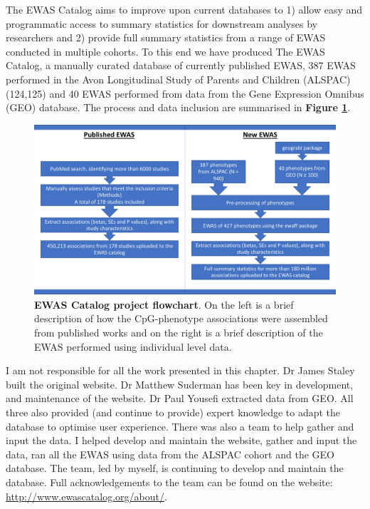 \documentclass[11pt,oneside]{bristolthesis}
\begin{document}
The EWAS Catalog aims to improve upon current databases to 1) allow easy and programmatic access to summary statistics for downstream analyses by researchers and 2) provide full summary statistics from a range of EWAS conducted in multiple cohorts. To this end we have produced The EWAS Catalog, a manually curated database of currently published EWAS, 387 EWAS performed in the Avon Longitudinal Study of Parents and Children (ALSPAC) (124,125) and 40 EWAS performed from data from the Gene Expression Omnibus (GEO) database. The process and data inclusion are summarised in \textbf{Figure \ref{fig:catalog-project-workflow}}.




\begin{figure}

{\centering \includegraphics[width=1\linewidth]{figure/03-ewas_catalog/project_flowchart} 

}

\caption[EWAS Catalog project flowchart]{\textbf{EWAS Catalog project flowchart}. On the left is a brief description of how the CpG-phenotype associations were assembled from published works and on the right is a brief description of the EWAS performed using individual level data.}\label{fig:catalog-project-workflow}
\end{figure}
I am not responsible for all the work presented in this chapter. Dr James Staley built the original website. Dr Matthew Suderman has been key in development, and maintenance of the website. Dr Paul Yousefi extracted data from GEO. All three also provided (and continue to provide) expert knowledge to adapt the database to optimise user experience. There was also a team to help gather and input the data. I helped develop and maintain the website, gather and input the data, ran all the EWAS using data from the ALSPAC cohort and the GEO database. The team, led by myself, is continuing to develop and maintain the database. Full acknowledgements to the team can be found on the website: \url{http://www.ewascatalog.org/about/}.
\end{document}
